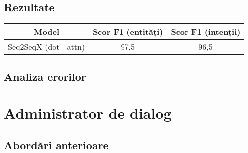 \subsection{Rezultate}

\begin{center}
	\begin{tabular}{ c c c } 
		\hline
		\textbf{Model} 		 & \textbf{Scor F1 (entități)} & \textbf{Scor F1 (intenții)}\\
		\hline
		Seq2SeqX (dot - attn) & 97,5 & 96,5 \\
		\hline
	\end{tabular}
\end{center}

\subsection{Analiza erorilor}




\section{Administrator de dialog}

\subsection{Abordări anterioare}